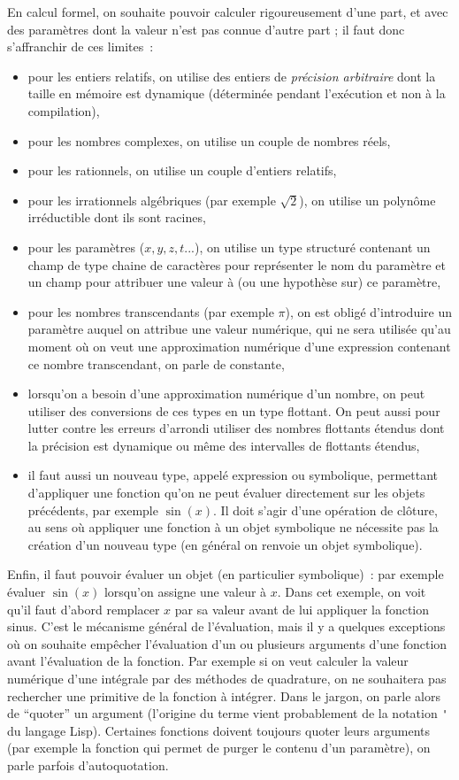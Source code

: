 \documentclass[a4paper,11pt]{article}
\begin{document}
\begin{giacjshere}
En calcul formel, on souhaite pouvoir calculer rigoureusement d'une part, 
et avec des param\`etres dont la valeur n'est 
pas connue d'autre part ; il faut donc s'affranchir de ces limites~: 
\begin{itemize}
\item pour les entiers relatifs, on utilise des entiers de 
{\em précision arbitraire}
dont la taille en mémoire est dynamique (déterminée pendant l'exécution et non
à la compilation),
\item pour les nombres complexes, on utilise un couple de nombres réels,
\item pour les rationnels, on utilise un couple d'entiers relatifs,
\item pour les irrationnels algébriques (par exemple $\sqrt{2}$), 
on utilise un polyn\^ome irréductible dont ils sont racines,
\item pour les param\`etres ($x,y,z,t...$), on utilise un type 
structuré contenant un champ de type chaine de caract\`eres pour 
repr\'esenter le nom du param\`etre et
un champ pour attribuer une valeur à (ou une hypoth\`ese sur) ce param\`etre,
\item pour les nombres transcendants (par exemple $\pi$), on est obligé
d'introduire un paramètre auquel on attribue une valeur numérique, 
qui ne sera utilisée qu'au moment où on veut une 
approximation numérique d'une expression contenant ce nombre transcendant,
on parle de constante,
\item lorsqu'on a besoin d'une approximation numérique d'un nombre,
on peut utiliser des conversions de ces types en un type flottant. On peut 
aussi pour lutter contre les erreurs 
d'arrondi utiliser des nombres flottants étendus dont la précision est 
dynamique ou même des intervalles de flottants étendus,
\item il faut aussi
un nouveau type, appelé expression ou symbolique, permettant d'appliquer
une fonction qu'on ne peut évaluer directement sur les objets pr\'ec\'edents,
par exemple $\sin(x)$. Il
doit s'agir d'une op\'eration de clôture, au sens où appliquer une fonction \`a
un objet symbolique ne nécessite pas la création d'un nouveau type
(en général on renvoie un objet symbolique).
\end{itemize}

Enfin, il faut pouvoir \'evaluer un objet (en particulier symbolique)~:
par exemple évaluer $\sin(x)$ lorsqu'on assigne une valeur \`a $x$. 
Dans cet exemple, on voit qu'il faut d'abord remplacer $x$ par
sa valeur avant de lui appliquer la fonction sinus. C'est le mécanisme
général de l'évaluation, mais il y a quelques exceptions où
on souhaite empêcher l'évaluation d'un ou plusieurs arguments
d'une fonction avant l'évaluation de la fonction. Par exemple si on 
veut calculer la valeur numérique d'une intégrale par des méthodes
de quadrature, on ne souhaitera pas rechercher une primitive de la 
fonction à intégrer. Dans le jargon, on parle alors de ``quoter'' un argument 
(l'origine du terme vient probablement de la notation \verb|'| du langage 
Lisp). Certaines fonctions doivent toujours quoter leurs arguments
(par exemple la fonction qui permet de purger le contenu d'un paramètre),
on parle parfois d'autoquotation.



\end{giacjshere}
\end{document}
